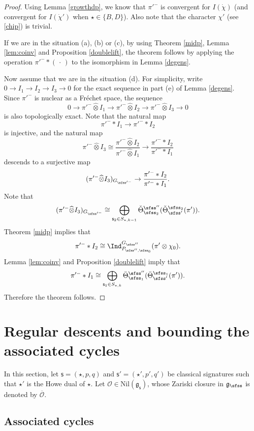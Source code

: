 \documentclass[12pt,a4paper]{amsart}
\newcommand{\CO}{{\mathcal {O}}}
\newcommand{\oS}{\operatorname{S}}
\newcommand{\g}{\mathfrak g}
\newcommand{\p}{\mathfrak p}
\numberwithin{equation}{section}
\theoremstyle{remark}
\def\Thetab{\bar{\Theta}}
\def\totimes{\widehat{\otimes}}
\begin{document}
\begin{proof}
Using Lemma \ref{growthdp}, we know that $\pi'^-$ is convergent for $I(\dot \chi)$ (and convergent for $I(\dot \chi')$ when $\star\in \{B,D\}$). Also note that the character $\chi'$ (see \eqref{chip}) is trivial.

If we are in the situation (a), (b) or (c), by using Theorem \ref{midp}, Lemma \ref{lem:coinv} and Proposition \ref{doublelift}, the theorem follows by applying the operation $\pi'^-*(\,\cdot\,)$ to the isomorphism in Lemma \ref{degens}.

Now assume that we are in the situation (d).
For simplicity, write $0\rightarrow I_1\rightarrow I_2\rightarrow I_3\rightarrow
0$ for the exact sequence in part (e) of Lemma \ref{degens}. Since $\pi'^-$ is nuclear as a Fr\'echet space, the sequence
\[
0\rightarrow \pi'^-\totimes I_1\rightarrow \pi'^-\totimes I_2\rightarrow \pi'^-\totimes I_3\rightarrow
0
\]
is also topologically exact.
Note that the natural map
\[
\pi'^- * I_1\rightarrow \pi'^- * I_2
\]
is injective, and the natural map
\[
  \pi'^-\totimes I_3\cong \frac{\pi'^-\totimes I_2}{\pi'^- \totimes I_1}\longrightarrow\frac{ \pi'^-*I_2}{\pi'^-*I_1}
  \]
descends to a surjective map
\[
  (\pi'^-\totimes  I_3)_{G_{\sfss'^-}}\rightarrow \frac{ \pi'^-*I_2}{\pi'^-*I_1}.
\]
Note that
\[
   (\pi'^-\totimes  I_3)_{G_{\sfss'^-}}\cong \bigoplus_{\mathsf s_2\in S_{\star, k-1}} \check \Theta^{\sfss''}_{\sfss_2}(\check \Theta^{\sfss_2}_{\sfss'}(\pi')).
\]
Theorem \ref{midp} implies that
\[
\pi'^-*I_2\cong \Ind_{P_{\sfss'',\sfss_0}}^{G_{\sfss''}} (\pi'\otimes \chi_0).
\]
Lemma \ref{lem:coinv} and Proposition \ref{doublelift} imply that
\[
\pi'^-*I_1\cong  \bigoplus_{\mathsf s_1\in S_{\star, k} } \Thetab^{\sfss''}_{\sfss_1}(\Thetab^{\sfss_1}_{\sfss'}(\pi')).
\]
Therefore the theorem follows.
\end{proof}

\section{Regular descents and bounding the associated  cycles}\label{sec:AC}

In this section, let $\mathsf s=(\star, p,q)$ and $ \mathsf s'=(\star', p',q')$ be classical signatures such that $\star'$ is the Howe dual of $\star$.
Let $\CO\in \mathrm{Nil}(\g_\mathsf s)$, whose Zariski closure in $\g_\sfss$ is denoted by $\overline \CO$. 


\subsection{Associated cycles}%
\end{document}
